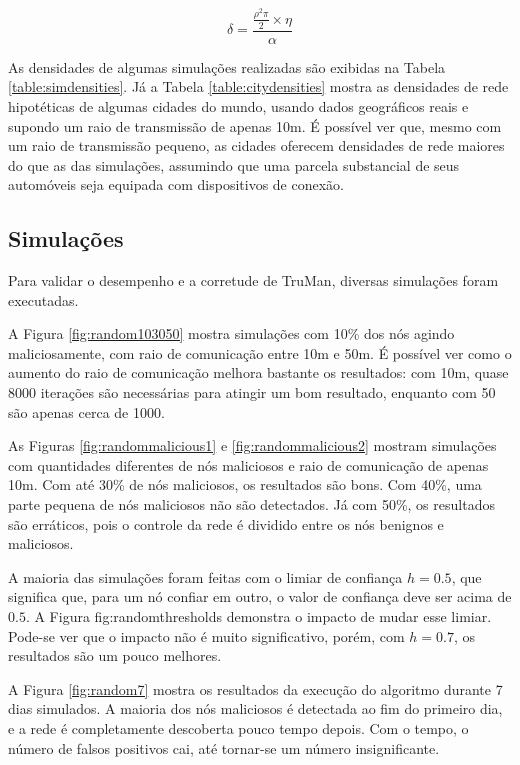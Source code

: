 \begin{resumoextendido}
	$$ \delta = \frac{\frac{\rho^2\pi}{2} \times \eta}{\alpha} $$
	
	As densidades de algumas simulações realizadas são exibidas na Tabela \ref{table:simdensities}.
	Já a Tabela \ref{table:citydensities} mostra as densidades de rede hipotéticas de algumas cidades do mundo, usando dados geográficos reais e supondo um raio de transmissão de apenas 10m.
	É possível ver que, mesmo com um raio de transmissão pequeno, as cidades oferecem densidades de rede maiores do que as das simulações, assumindo que uma parcela substancial de seus automóveis seja equipada com dispositivos de conexão.
	
	\subsection*{Simulações}
	
	Para validar o desempenho e a corretude de TruMan, diversas simulações foram executadas.
	
	A Figura \ref{fig:random103050} mostra simulações com 10\% dos nós agindo maliciosamente, com raio de comunicação entre 10m e 50m.
	É possível ver como o aumento do raio de comunicação melhora bastante os resultados:
	com 10m, quase 8000 iterações são necessárias para atingir um bom resultado, enquanto com 50 são apenas cerca de 1000.
	
	As Figuras \ref{fig:randommalicious1} e \ref{fig:randommalicious2} mostram simulações com quantidades diferentes de nós maliciosos e raio de comunicação de apenas 10m.
	Com até 30\% de nós maliciosos, os resultados são bons.
	Com 40\%, uma parte pequena de nós maliciosos não são detectados.
	Já com 50\%, os resultados são erráticos, pois o controle da rede é dividido entre os nós benignos e maliciosos.
	
	A maioria das simulações foram feitas com o limiar de confiança $h=0.5$, que significa que, para um nó confiar em outro, o valor de confiança deve ser acima de $0.5$.
	A Figura {fig:randomthresholds} demonstra o impacto de mudar esse limiar.
	Pode-se ver que o impacto não é muito significativo, porém, com $h=0.7$, os resultados são um pouco melhores.
	
	A Figura \ref{fig:random7} mostra os resultados da execução do algoritmo durante 7 dias simulados.
	A maioria dos nós maliciosos é detectada ao fim do primeiro dia, e a rede é completamente descoberta pouco tempo depois.
	Com o tempo, o número de falsos positivos cai, até tornar-se um número insignificante.
	

\end{resumoextendido}
